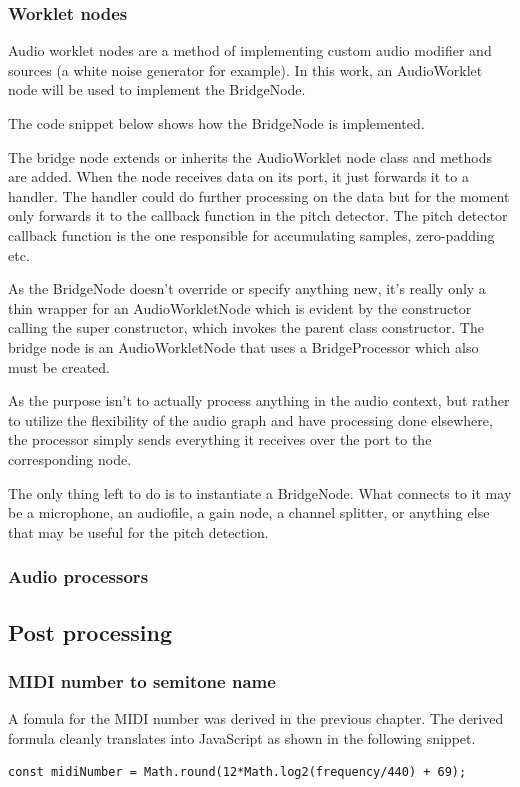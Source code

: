 \subsubsection{Worklet nodes}
Audio worklet nodes are a method of implementing custom audio modifier and sources (a white noise generator for example). In this work, an AudioWorklet node will be used to implement the BridgeNode.

The code snippet below shows how the BridgeNode is implemented.

The bridge node extends or inherits the AudioWorklet node class and methods are added. When the node receives data on its port, it just forwards it to a handler. The handler could do further processing on the data but for the moment only forwards it to the callback function in the pitch detector. The pitch detector callback function is the one responsible for accumulating samples, zero-padding etc.

As the BridgeNode doesn't override or specify anything new, it's really only a thin wrapper for an AudioWorkletNode which is evident by the constructor calling the super constructor, which invokes the parent class constructor. The bridge node is an AudioWorkletNode that uses a BridgeProcessor which also must be created. 

As the purpose isn't to actually process anything in the audio context, but rather to utilize the flexibility of the audio graph and have processing done elsewhere, the processor simply sends everything it receives over the port to the corresponding node. 

The only thing left to do is to instantiate a BridgeNode. What connects to it may be a microphone, an audiofile, a gain node, a channel splitter, or anything else that may be useful for the pitch detection.


\subsubsection{Audio processors}

\subsection{Post processing}

\subsubsection{MIDI number to semitone name}
A fomula for the MIDI number was derived in the previous chapter. The derived formula cleanly translates into JavaScript as shown in the following snippet.
\begin{lstlisting}[style=javascript]
    const midiNumber = Math.round(12*Math.log2(frequency/440) + 69);
\end{lstlisting}

